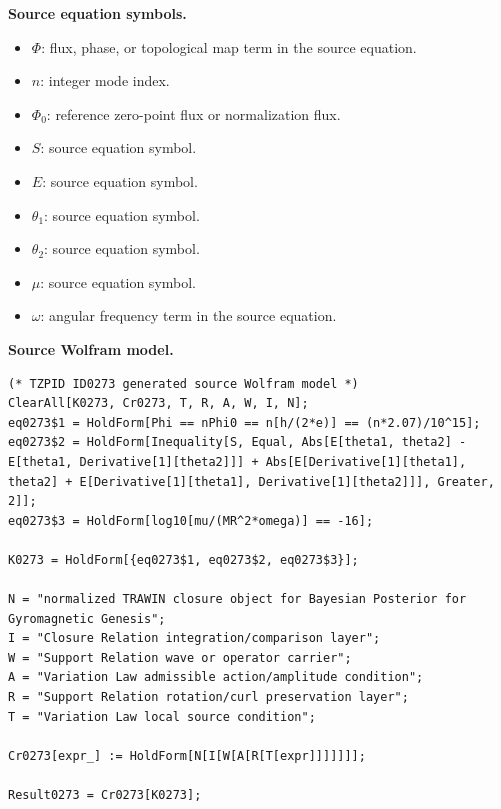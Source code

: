 \begin{minipage}[t]{0.49\linewidth}
\begingroup
\small
\raggedright
\textbf{Source equation symbols.}\par
\begin{itemize}[leftmargin=1.35em,itemsep=1pt,topsep=1pt,parsep=0pt]
    \item $\Phi$: flux, phase, or topological map term in the source equation.
    \item $n$: integer mode index.
    \item $\Phi_0$: reference zero-point flux or normalization flux.
    \item $S$: source equation symbol.
    \item $E$: source equation symbol.
    \item $\theta_1$: source equation symbol.
    \item $\theta_2$: source equation symbol.
    \item $\mu$: source equation symbol.
    \item $\omega$: angular frequency term in the source equation.
\end{itemize}
\endgroup
\end{minipage}\hfill
\begin{minipage}[t]{0.47\linewidth}
\begingroup
\scriptsize
\raggedright
\textbf{Source Wolfram model.}\par
\begin{Verbatim}[fontsize=\tiny,breaklines=true,breakanywhere=true]
(* TZPID ID0273 generated source Wolfram model *)
ClearAll[K0273, Cr0273, T, R, A, W, I, N];
eq0273$1 = HoldForm[Phi == nPhi0 == n[h/(2*e)] == (n*2.07)/10^15];
eq0273$2 = HoldForm[Inequality[S, Equal, Abs[E[theta1, theta2] - E[theta1, Derivative[1][theta2]]] + Abs[E[Derivative[1][theta1], theta2] + E[Derivative[1][theta1], Derivative[1][theta2]]], Greater, 2]];
eq0273$3 = HoldForm[log10[mu/(MR^2*omega)] == -16];

K0273 = HoldForm[{eq0273$1, eq0273$2, eq0273$3}];

N = "normalized TRAWIN closure object for Bayesian Posterior for Gyromagnetic Genesis";
I = "Closure Relation integration/comparison layer";
W = "Support Relation wave or operator carrier";
A = "Variation Law admissible action/amplitude condition";
R = "Support Relation rotation/curl preservation layer";
T = "Variation Law local source condition";

Cr0273[expr_] := HoldForm[N[I[W[A[R[T[expr]]]]]]];

Result0273 = Cr0273[K0273];
\end{Verbatim}
\endgroup
\end{minipage}

